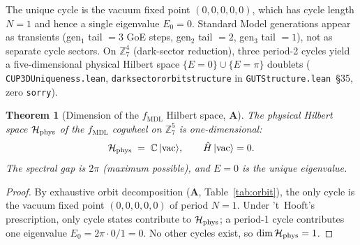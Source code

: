 \documentclass[11pt]{article}
\newtheorem{theorem}{Theorem}[section]
\theoremstyle{remark}
\newcommand{\MDL}{\text{MDL}}
\newcommand{\lean}[1]{%
  \penalty-100
  \begingroup\def\_{\textunderscore\allowbreak}\texttt{#1}\endgroup}
\newcommand{\CatA}{\textbf{A}}
\newcommand{\ket}[1]{|{#1}\rangle}
\newcommand{\Hil}{\mathcal{H}}
\newcommand{\Ham}{\hat{H}}
\begin{document}
The unique cycle is the vacuum fixed point $(0,0,0,0,0)$,
which has cycle length $N=1$ and hence a single eigenvalue $E_0 = 0$.
Standard Model generations appear as transients (gen$_1$ tail $= 3$ GoE steps,
gen$_2$ tail $= 2$, gen$_3$ tail $= 1$), not as separate cycle sectors.
On $\mathbb{Z}_7^4$ (dark-sector reduction), three period-2 cycles yield a
five-dimensional physical Hilbert space $\{E=0\} \cup \{E=\pi\}$ doublets
(\lean{CUP3DUniqueness.lean}, \lean{dark\_sector\_orbit\_structure} in
\texttt{GUTStructure.lean}~\S35, zero \texttt{sorry}).

\begin{theorem}[Dimension of the $f_{\MDL}$ Hilbert space, \CatA{}]
\label{thm:hilbert_dim}
The physical Hilbert space $\Hil_{\rm phys}$ of the $f_{\MDL}$
cogwheel on $\mathbb{Z}_7^5$ is one-dimensional:
\[
\Hil_{\rm phys} \;=\; \mathbb{C}\,\ket{\mathrm{vac}},
\qquad
\Ham\,\ket{\mathrm{vac}} = 0.
\]
The spectral gap is $2\pi$ (maximum possible), and $E=0$ is the
unique eigenvalue.
\end{theorem}

\begin{proof}
By exhaustive orbit decomposition (\CatA{}, Table~\ref{tab:orbit}),
the only cycle is the vacuum fixed point $(0,0,0,0,0)$ of period $N=1$.
Under 't~Hooft's prescription, only cycle states contribute to
$\Hil_{\rm phys}$; a period-1 cycle contributes one eigenvalue
$E_0 = 2\pi\cdot 0/1 = 0$.
No other cycles exist, so $\dim\Hil_{\rm phys} = 1$.
\end{proof}
\end{document}
